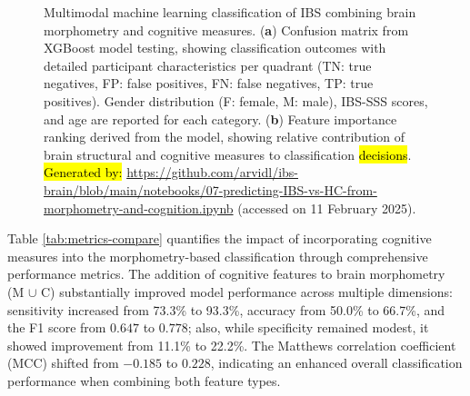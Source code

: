 \documentclass[diagnostics,article,accept,pdftex,moreauthors]{Definitions/mdpi}
\begin{document}
\begin{figure}[H]
\caption{{{Multimodal machine learning classification of IBS combining brain morphometry and cognitive measures}}. (\textbf{a}) Confusion matrix from XGBoost model testing, showing classification outcomes with detailed participant characteristics per quadrant (TN: true negatives, FP: false positives, FN: false negatives, TP: true positives). Gender distribution (F: female, M: male), IBS-SSS scores, and age are reported for each category. (\textbf{b}) Feature importance ranking derived from the model, showing relative contribution of brain structural and cognitive measures to classification \hl{decisions}. %
{\hl{Generated by:} {{\url{https://github.com/arvidl/ibs-brain/blob/main/notebooks/07-predicting-IBS-vs-HC-from-morphometry-and-cognition.ipynb}}}} (accessed on 11 February 2025).}
\label{fig:confusion-matrix-xgboost-rbans}
\end{figure} 



Table \ref{tab:metrics-compare} quantifies the impact of incorporating cognitive measures into the morphometry-based classification through comprehensive performance metrics. The addition of cognitive features to brain morphometry (M $\cup$ C) substantially improved model performance across multiple dimensions: sensitivity increased from 73.3\% to 93.3\%, accuracy from 50.0\% to 66.7\%, and the F1 score from $0.647$ to $0.778$; also, while specificity remained modest, it showed improvement from 11.1\% to 22.2\%. The Matthews correlation coefficient (MCC) shifted from $-0.185$ to $0.228$, indicating an enhanced overall classification performance when combining both feature types.
\end{document}
